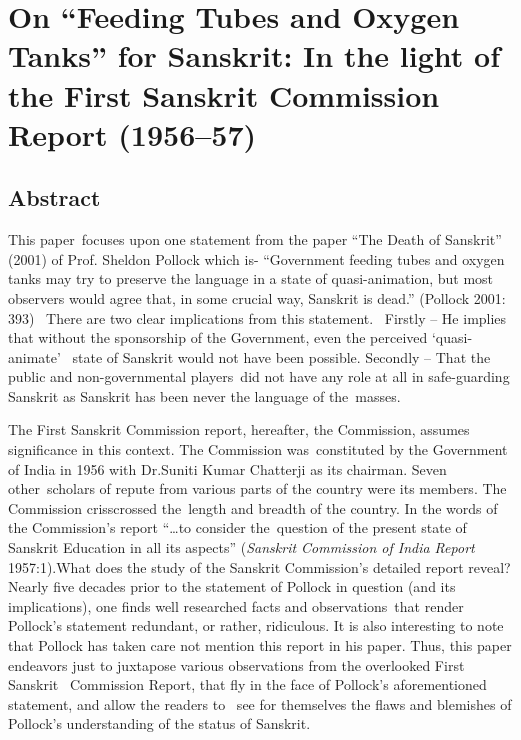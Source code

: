 \chapter[On “Feeding Tubes and Oxygen Tanks” for Sanskrit....]{On “Feeding Tubes and Oxygen Tanks” for Sanskrit: 
In the light of the First Sanskrit Commission Report (1956--57)}\label{chapter6}


\section*{Abstract}
 
This paper focuses upon one statement from the paper “The Death of Sanskrit” (2001) of Prof. Sheldon Pollock which is- “Government feeding tubes and oxygen tanks may try to preserve the language in a state of quasi-animation, but most observers would agree that, in some crucial way, Sanskrit is dead.” (Pollock 2001: 393)  There are two clear implications from this statement.  Firstly – He implies that without the sponsorship of the Government, even the perceived ‘quasi-animate’  state of Sanskrit would not have been possible. Secondly – That the public and non-governmental players did not have any role at all in safe-guarding Sanskrit as Sanskrit has been never the language of the masses.  

The First Sanskrit Commission report, hereafter, the Commission, assumes significance in this context. The Commission was constituted by the Government of India in 1956 with Dr.Suniti Kumar Chatterji as its chairman. Seven other scholars of repute from various parts of the country were its members. The Commission crisscrossed the length and breadth of the country. In the words of the Commission’s report “…to consider the question of the present state of Sanskrit Education in all its aspects” ({\sl Sanskrit Commission of India Report} 1957:1).What does the study of the Sanskrit Commission’s detailed report reveal? Nearly five decades prior to the statement of Pollock in question (and its implications), one finds well researched facts and observations that render Pollock’s statement redundant, or rather, ridiculous. It is also interesting to note that Pollock has taken care not mention this report in his paper. Thus, this paper endeavors just to juxtapose various observations from the overlooked First Sanskrit  Commission Report, that fly in the face of Pollock’s aforementioned statement, and allow the readers to  see for themselves the flaws and blemishes of Pollock’s understanding of the status of Sanskrit.

